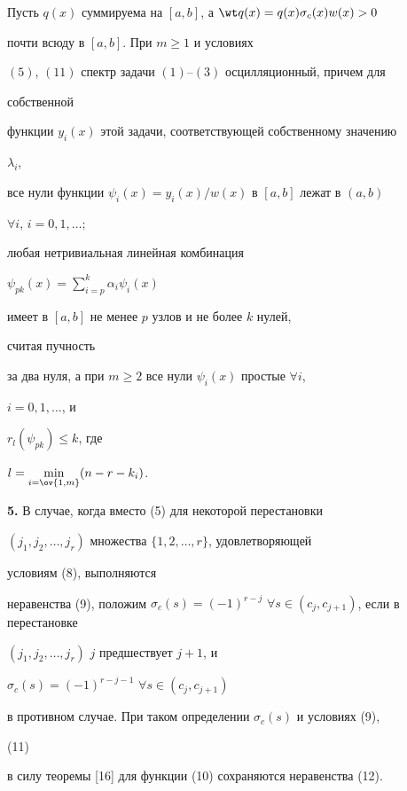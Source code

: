 \begin{thmnonum} Пусть $q(x)$ суммируема на $[a,b]$, а $\wt 


q(x)=q(x)\sigma_c(x)w(x)>0$ 


почти всюду в $[a,b]$. При $m\ge 1$ и условиях 


$(5)$, $(11)$ спектр задачи $(1)$--$(3)$ осцилляционный, причем для 


собственной 


функции $y_i(x)$ этой задачи, соответствующей собственному значению 


$\lambda_i$, 


все нули функции $\psi_i(x)=y_i(x)/w(x)$ в $[a,b]$ лежат в $(a,b)$ 


$\forall i$, $i=0,1,\dotsc;$ 


любая нетривиальная линейная комбинация 


$\psi_{p k}(x)=\sum\limits^k_{i=p}\alpha_i\psi_i(x)$ 


имеет в $[a,b]$ не менее $p$ узлов и не более $k$ нулей, 


считая пучность 


за два нуля, а при $m\ge 2$ все нули $\psi_i(x)$ простые $\forall i$, 


$i=0,1,\dotsc$, и 


$r_l(\psi_{p k})\le k$, где 


$l=\min\limits_{i=\ov{1,m}}(n-r-k_i)$. 


\end{thmnonum} 


 


{\bf 5.} В случае, когда вместо (5) для некоторой перестановки 


$(j_1,j_2,\dotsc,j_r)$ множества $\{1,2,\dotsc,r\}$, удовлетворяющей 


условиям (8), выполняются 


неравенства (9), положим $\sigma_c(s)=(-1)^{r-j}$ $\forall 


s\in(c_j,c_{j+1})$, если в перестановке 


$(j_1,j_2,\dotsc,j_r)$\; $j$ предшествует $j+1$, и 


$\sigma_c(s)=(-1)^{r-j-1}$ $\forall s\in(c_j,c_{j+1})$ 


в противном случае. При таком определении $\sigma_c(s)$ и условиях (9), 


(11)


в силу теоремы [16] для функции (10) сохраняются неравенства (12). 


